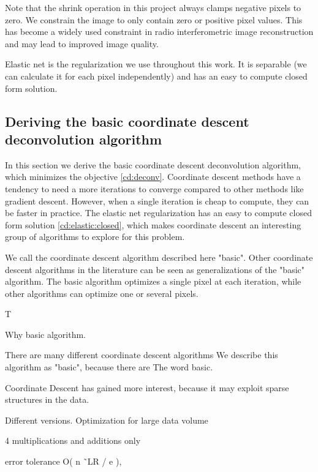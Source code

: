 
Note that the shrink operation in this project always clamps negative pixels to zero. We constrain the image to only contain zero or positive pixel values. This has become a widely used constraint in radio interferometric image reconstruction and may lead to improved image quality\cite{mcewen2011compressed}.

Elastic net is the regularization we use throughout this work. It is separable (we can calculate it for each pixel independently) and has an easy to compute closed form solution.


\subsection{Deriving the basic coordinate descent deconvolution algorithm}\label{cd:deriving}
In this section we derive the basic coordinate descent deconvolution algorithm, which minimizes the objective \eqref{cd:deconv}. Coordinate descent methods have a tendency to need a more iterations to converge compared to other methods like gradient descent. However, when a single iteration is cheap to compute, they can be faster in practice. The elastic net regularization has an easy to compute closed form solution \eqref{cd:elastic:closed}, which makes coordinate descent an interesting group of algorithms to explore for this problem.

We call the coordinate descent algorithm described here "basic". Other coordinate descent algorithms in the literature\cite{richtarik2016parallel,fercoq2015accelerated, richtarik2016distributed} can be seen as generalizations of the "basic" algorithm. The basic algorithm optimizes a single pixel at each iteration, while other algorithms can optimize one or several pixels.

T

Why basic algorithm.

There are many different coordinate descent algorithms We describe this algorithm as "basic", because there are 
The word basic.


Coordinate Descent has gained more interest, because it may exploit sparse structures in the data.

Different versions.
Optimization for large data volume\cite{richtarik2016distributed}

4 multiplications and additions only\cite{richtarik2012efficient}

error tolerance O( n ˜LR / e ), \cite{richtarik2016parallel}




